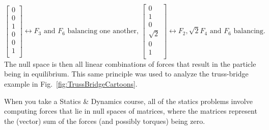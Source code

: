 $$\left[\begin{array}{c} 0\\0 \\  1\\0 \\ 0\\1 \\ \end{array} \right] \leftrightarrow F_3 \text{ and } F_6 \text{ balancing one another, }
\left[\begin{array}{r} 0\\1 \\  0\\ \sqrt{2} \\ 0\\1 \\ \end{array} \right] \leftrightarrow F_2, \sqrt{2} F_4 \text{ and } F_6 \text{ balancing.}~~~~~$$
The null space is then all linear combinations of forces that result in the particle being in equilibrium. This same principle was used to analyze the truss-bridge example in Fig.~\ref{fig:TrussBridgeCartoons}.\\

\begin{tcolorbox}[title={\bf Statics Problems and Null Spaces}]
 When you take a Statics \& Dynamics course, all of the statics problems involve computing forces that lie in null spaces of matrices, where the matrices represent the (vector) sum of the forces (and possibly torques) being zero. 
\end{tcolorbox}

\vspace*{.2cm}


